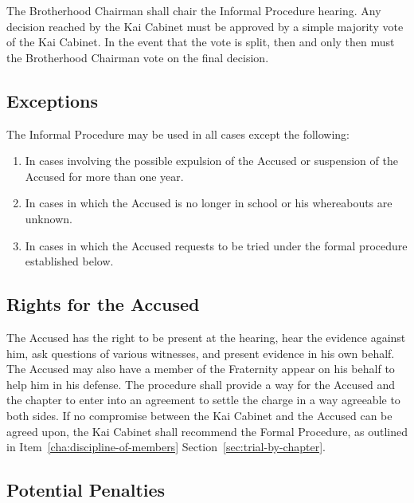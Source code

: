 The Brotherhood Chairman shall chair the Informal Procedure hearing.
Any decision reached by the Kai Cabinet must be approved by a simple majority
vote of the Kai Cabinet.
In the event that the vote is split, then and only then must the Brotherhood
Chairman vote on the final decision.

\subsection{Exceptions}
\label{sec:exceptions}
The Informal Procedure may be used in all cases except the following:
\begin{enumerate}
    \item In cases involving the possible expulsion of the Accused or
        suspension of the Accused for more than one year.
    \item In cases in which the Accused is no longer in school or his
        whereabouts are unknown.
    \item In cases in which the Accused requests to be tried under the formal
        procedure established below.
\end{enumerate}

\subsection{Rights for the Accused}

The Accused has the right to be present at the hearing, hear the evidence
against him, ask questions of various witnesses, and present evidence in his
own behalf.
The Accused may also have a member of the Fraternity appear on his behalf to
help him in his defense.
The procedure shall provide a way for the Accused and the chapter to enter into
an agreement to settle the charge in a way agreeable to both sides.
If no compromise between the Kai Cabinet and the Accused can be agreed upon,
the Kai Cabinet shall recommend the Formal Procedure, as outlined in
Item~\ref{cha:discipline-of-members} Section~\ref{sec:trial-by-chapter}.

\subsection{Potential Penalties}

